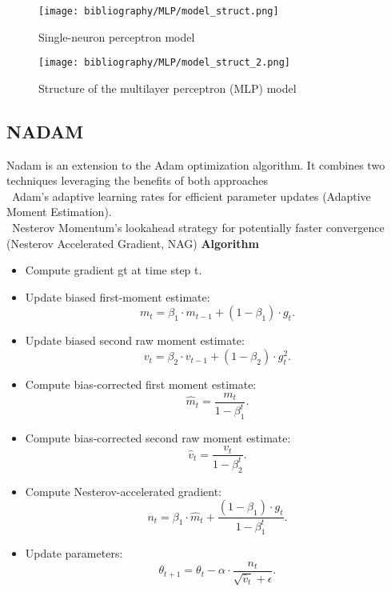 \documentclass{ieeeojies}
\begin{document}
\begin{figure}[H]
    \centering
    \begin{minipage}{0.45\textwidth}
    \centering
    \texttt{[image: bibliography/MLP/model\_struct.png]} 
    \label{fig:1}
    \caption{Single-neuron perceptron model \cite{b15}}
    \end{minipage}
\end{figure}

\begin{figure}[H]
    \centering
    \begin{minipage}{0.45\textwidth}
    \centering
    \texttt{[image: bibliography/MLP/model\_struct\_2.png]} 
    \label{fig:1}
    \caption{Structure of the multilayer perceptron (MLP) model \cite{b16}}
    \end{minipage}
\end{figure} 

\subsection{NADAM} 
Nadam is an extension to the Adam optimization algorithm. It combines two techniques leveraging the benefits of both approaches \\
    \indent\textbullet\ Adam's adaptive learning rates for efficient parameter updates (Adaptive Moment Estimation). \\
    \indent\textbullet\ Nesterov Momentum's lookahead strategy for potentially faster convergence (Nesterov Accelerated Gradient, NAG)
\textbf{Algorithm}
\begin{itemize}
    \item Compute gradient gt at time step t. 
    \item Update biased first-moment estimate:
        \[m_t = \beta_1 \cdot m_{t-1} + (1 - \beta_1) \cdot g_t. \]
    \item Update biased second raw moment estimate:
        \[ v_t = \beta_2 \cdot v_{t-1} + (1 - \beta_2) \cdot g_t^2. \]
    \item Compute bias-corrected first moment estimate:
        \[\hat{m}_t = \frac{m_t}{1-\beta_1^t}.\]
    \item Compute bias-corrected second raw moment estimate:
        \[ \hat{v}_t = \frac{v_t}{1-\beta_2^t}.\]
    \item Compute Nesterov-accelerated gradient:
        \[ n_t = \beta_1 \cdot \hat{m}_t + \frac{(1-\beta_1) \cdot g_t}{1-\beta_1^t}.\]
    \item Update parameters:
        \[ \theta_{t+1} = \theta_t - \alpha \cdot \frac{n_t}{\sqrt{\hat{v}_t} + \epsilon}.\]
\end{itemize}
 
\end{document}
